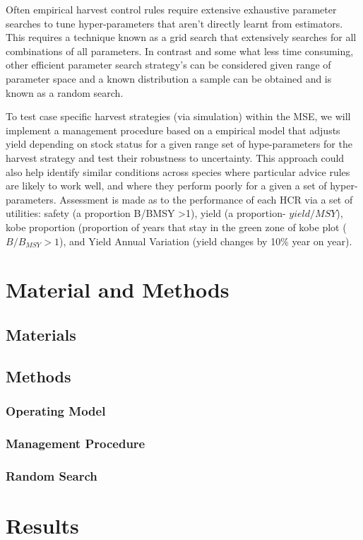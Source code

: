 \documentclass[11pt]{article}
\begin{document}
Often empirical harvest control rules require extensive exhaustive parameter searches to tune hyper-parameters that aren’t directly learnt from estimators.  This requires a technique known as a grid search that extensively searches for all combinations of all parameters. In contrast and some what less time consuming, other efficient parameter search strategy’s can be considered given range of parameter space and a known distribution a sample can be obtained and is known as a random search.  

To test case specific harvest strategies (via simulation) within the MSE, we will implement a management procedure based on a empirical model that adjusts yield depending on stock status for a given range set of hype-parameters for the harvest strategy and test their robustness to uncertainty.  This approach could also help identify similar conditions across species where particular advice rules are likely to work well, and where they perform poorly for a given a set of hyper-parameters. Assessment is made as to the performance of each HCR via a set of utilities: safety (a proportion B/BMSY >1), yield (a proportion- $yield/MSY$), kobe proportion (proportion of years that stay in the green zone of kobe plot ($B/B_{MSY} >1$), and Yield Annual Variation (yield changes by 10\% year on year).  

\section{Material and Methods}
\subsection{Materials}
\subsection{Methods}
\subsubsection{Operating Model}
\subsubsection{Management Procedure}

\subsubsection{Random Search}


\section{Results}
\end{document}
